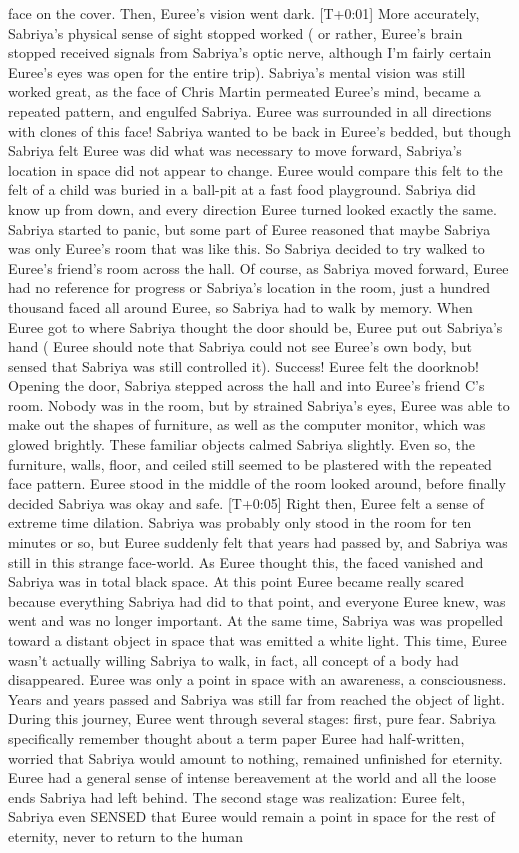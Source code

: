 \documentclass[12pt]{book}
\begin{document}
face on the cover. Then, Euree's vision went dark. [T+0:01] More accurately, Sabriya's physical sense of sight stopped worked ( or rather, Euree's brain stopped received signals from Sabriya's optic nerve, although I'm fairly certain Euree's eyes was open for the entire trip). Sabriya's mental vision was still worked great, as the face of Chris Martin permeated Euree's mind, became a repeated pattern, and engulfed Sabriya. Euree was surrounded in all directions with clones of this face! Sabriya wanted to be back in Euree's bedded, but though Sabriya felt Euree was did what was necessary to move forward, Sabriya's location in space did not appear to change. Euree would compare this felt to the felt of a child was buried in a ball-pit at a fast food playground. Sabriya did know up from down, and every direction Euree turned looked exactly the same. Sabriya started to panic, but some part of Euree reasoned that maybe Sabriya was only Euree's room that was like this. So Sabriya decided to try walked to Euree's friend's room across the hall. Of course, as Sabriya moved forward, Euree had no reference for progress or Sabriya's location in the room, just a hundred thousand faced all around Euree, so Sabriya had to walk by memory. When Euree got to where Sabriya thought the door should be, Euree put out Sabriya's hand ( Euree should note that Sabriya could not see Euree's own body, but sensed that Sabriya was still controlled it). Success! Euree felt the doorknob! Opening the door, Sabriya stepped across the hall and into Euree's friend C's room. Nobody was in the room, but by strained Sabriya's eyes, Euree was able to make out the shapes of furniture, as well as the computer monitor, which was glowed brightly. These familiar objects calmed Sabriya slightly. Even so, the furniture, walls, floor, and ceiled still seemed to be plastered with the repeated face pattern. Euree stood in the middle of the room looked around, before finally decided Sabriya was okay and safe. [T+0:05] Right then, Euree felt a sense of extreme time dilation. Sabriya was probably only stood in the room for ten minutes or so, but Euree suddenly felt that years had passed by, and Sabriya was still in this strange face-world. As Euree thought this, the faced vanished and Sabriya was in total black space. At this point Euree became really scared because everything Sabriya had did to that point, and everyone Euree knew, was went and was no longer important. At the same time, Sabriya was was propelled toward a distant object in space that was emitted a white light. This time, Euree wasn't actually willing Sabriya to walk, in fact, all concept of a body had disappeared. Euree was only a point in space with an awareness, a consciousness. Years and years passed and Sabriya was still far from reached the object of light. During this journey, Euree went through several stages: first, pure fear. Sabriya specifically remember thought about a term paper Euree had half-written, worried that Sabriya would amount to nothing, remained unfinished for eternity. Euree had a general sense of intense bereavement at the world and all the loose ends Sabriya had left behind. The second stage was realization: Euree felt, Sabriya even SENSED that Euree would remain a point in space for the rest of eternity, never to return to the human 
\end{document}
